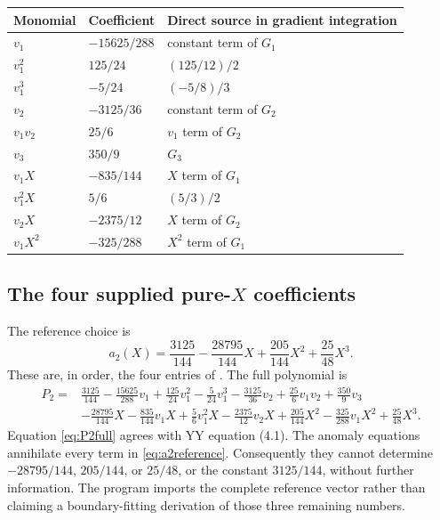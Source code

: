 \documentclass[11pt,a4paper]{article}
\numberwithin{equation}{section}
\newcommand{\code}[1]{\texttt{\detokenize{#1}}}
\begin{document}
\begin{center}
\begin{tabular}{lll}
\toprule
Monomial & Coefficient & Direct source in gradient integration\\\midrule
$v_1$ & $-15625/288$ & constant term of $G_1$\\
$v_1^2$ & $125/24$ & $(125/12)/2$\\
$v_1^3$ & $-5/24$ & $(-5/8)/3$\\
$v_2$ & $-3125/36$ & constant term of $G_2$\\
$v_1v_2$ & $25/6$ & $v_1$ term of $G_2$\\
$v_3$ & $350/9$ & $G_3$\\
$v_1X$ & $-835/144$ & $X$ term of $G_1$\\
$v_1^2X$ & $5/6$ & $(5/3)/2$\\
$v_2X$ & $-2375/12$ & $X$ term of $G_2$\\
$v_1X^2$ & $-325/288$ & $X^2$ term of $G_1$\\\bottomrule
\end{tabular}
\end{center}

\subsection{The four supplied pure-\texorpdfstring{$X$}{X} coefficients}
The reference choice is
\begin{equation}
a_2(X)=\frac{3125}{144}-\frac{28795}{144}X
       +\frac{205}{144}X^2+\frac{25}{48}X^3.
\label{eq:a2reference}
\end{equation}
These are, in order, the four entries of \code{YY_GENUS2_AMBIGUITY}.
The full polynomial is
\begin{equation}\boxed{\begin{aligned}
P_2={}&\frac{3125}{144}-\frac{15625}{288}v_1
 +\frac{125}{24}v_1^2-\frac5{24}v_1^3
 -\frac{3125}{36}v_2+\frac{25}{6}v_1v_2+\frac{350}{9}v_3\\
 &-\frac{28795}{144}X-\frac{835}{144}v_1X
 +\frac56v_1^2X-\frac{2375}{12}v_2X
 +\frac{205}{144}X^2-\frac{325}{288}v_1X^2+\frac{25}{48}X^3.
\end{aligned}}\label{eq:P2full}
\end{equation}
Equation \eqref{eq:P2full} agrees with YY equation (4.1).
The anomaly equations annihilate every term in \eqref{eq:a2reference}.
Consequently they cannot determine $-28795/144$, $205/144$, or $25/48$,
or the constant $3125/144$, without further information. The program imports
the complete reference vector rather than claiming a boundary-fitting derivation
of those three remaining numbers.
\end{document}
